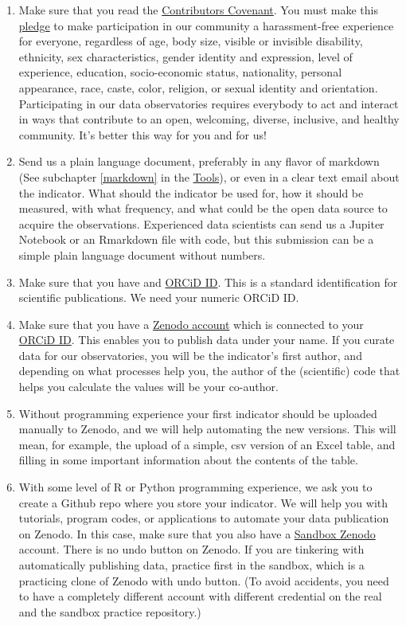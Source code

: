 \documentclass[
  a4paper,
  openany, a4paper, oneside]{book}
\begin{document}
\begin{enumerate}
\def\labelenumi{\arabic{enumi}.}
\item
  Make sure that you read the \href{https://www.contributor-covenant.org/}{Contributors Covenant}. You must make this \href{https://www.contributor-covenant.org/version/2/0/code_of_conduct/}{pledge} to make participation in our community a harassment-free experience for everyone, regardless of age, body size, visible or invisible disability, ethnicity, sex characteristics, gender identity and expression, level of experience, education, socio-economic status, nationality, personal appearance, race, caste, color, religion, or sexual identity and orientation. Participating in our data observatories requires everybody to act and interact in ways that contribute to an open, welcoming, diverse, inclusive, and healthy community. It's better this way for you and for us!
\item
  Send us a plain language document, preferably in any flavor of markdown (See subchapter \ref{markdown} in the \protect\hyperlink{markdown}{Tools}), or even in a clear text email about the indicator. What should the indicator be used for, how it should be measured, with what frequency, and what could be the open data source to acquire the observations. Experienced data scientists can send us a Jupiter Notebook or an Rmarkdown file with code, but this submission can be a simple plain language document without numbers.
\item
  Make sure that you have and \href{https://orcid.org/}{ORCiD ID}. This is a standard identification for scientific publications. We need your numeric ORCiD ID.
\item
  Make sure that you have a \href{https://zenodo.org/}{Zenodo account} which is connected to your \href{https://orcid.org/}{ORCiD ID}. This enables you to publish data under your name. If you curate data for our observatories, you will be the indicator's first author, and depending on what processes help you, the author of the (scientific) code that helps you calculate the values will be your co-author.
\item
  Without programming experience your first indicator should be uploaded manually to Zenodo, and we will help automating the new versions. This will mean, for example, the upload of a simple, csv version of an Excel table, and filling in some important information about the contents of the table.
\item
  With some level of R or Python programming experience, we ask you to create a Github repo where you store your indicator. We will help you with tutorials, program codes, or applications to automate your data publication on Zenodo. In this case, make sure that you also have a \href{https://sandbox.zenodo.org/}{Sandbox Zenodo} account. There is no undo button on Zenodo. If you are tinkering with automatically publishing data, practice first in the sandbox, which is a practicing clone of Zenodo with undo button. (To avoid accidents, you need to have a completely different account with different credential on the real and the sandbox practice repository.)

\end{enumerate}
\end{document}
